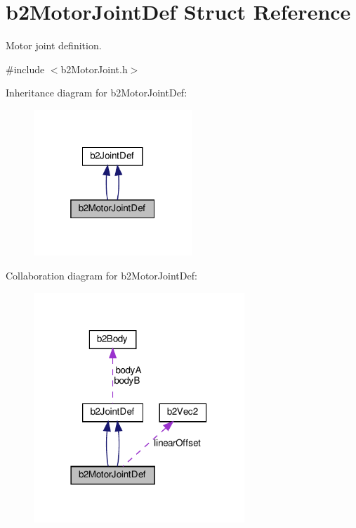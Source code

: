 \hypertarget{structb2MotorJointDef}{}\section{b2\+Motor\+Joint\+Def Struct Reference}
\label{structb2MotorJointDef}


Motor joint definition.  




{\ttfamily \#include $<$b2\+Motor\+Joint.\+h$>$}



Inheritance diagram for b2\+Motor\+Joint\+Def\+:
\nopagebreak
\begin{figure}[H]
\begin{center}
\leavevmode
\includegraphics[width=169pt]{structb2MotorJointDef__inherit__graph}
\end{center}
\end{figure}


Collaboration diagram for b2\+Motor\+Joint\+Def\+:
\nopagebreak
\begin{figure}[H]
\begin{center}
\leavevmode
\includegraphics[width=225pt]{structb2MotorJointDef__coll__graph}
\end{center}
\end{figure}
